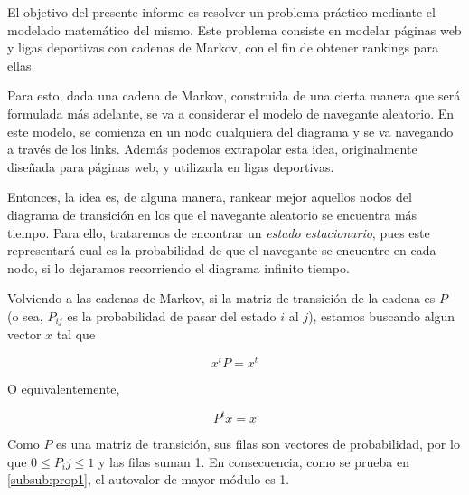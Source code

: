 
El objetivo del presente informe es resolver un problema práctico mediante el modelado matemático del mismo. Este problema consiste en modelar páginas web y ligas deportivas con cadenas de Markov, con el fin de obtener rankings para ellas.

Para esto, dada una cadena de Markov, construida de una cierta manera que será formulada más adelante, se va a considerar el modelo de navegante aleatorio. En este modelo, se comienza en un nodo cualquiera del diagrama y se va navegando a trav\'es de los links. Además podemos extrapolar esta idea, originalmente diseñada para páginas web, y utilizarla en ligas deportivas.

Entonces, la idea es, de alguna manera, rankear mejor aquellos nodos del diagrama de transición en los que el navegante aleatorio se encuentra más tiempo. Para ello, trataremos de encontrar un \emph{estado estacionario}, pues este representará cual es la probabilidad de que el navegante se encuentre en cada nodo, si lo dejaramos recorriendo el diagrama infinito tiempo.

Volviendo a las cadenas de Markov, si la matriz de transición de la cadena es $P$ (o sea, $P_{ij}$ es la probabilidad de pasar del estado $i$ al $j$), estamos buscando algun vector $x$ tal que

\[ x^t P = x^t \]

O equivalentemente,

\[P^t x = x\]

Como $P$ es una matriz de transición, sus filas son vectores de probabilidad, por lo que $0 \leq P_ij \leq 1$ y las filas suman 1. En consecuencia, como se prueba en \ref{subsub:prop1}, el autovalor de mayor módulo es 1.


